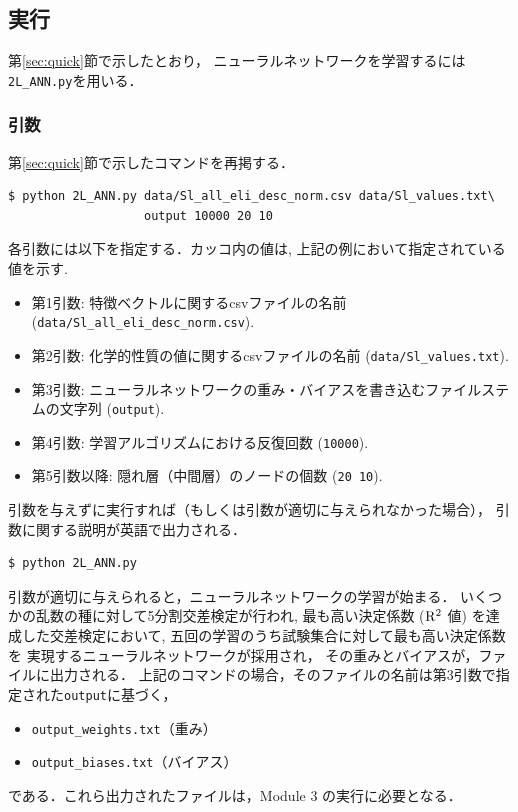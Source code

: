 \documentclass[11pt, titlepage, dvipdfmx, twoside]{jarticle}
\newcommand{\secref}[1]{第\ref{sec:#1}節}
\begin{document}
\subsection{実行}
\secref{quick}で示したとおり，
ニューラルネットワークを学習するには{\tt 2L\_ANN.py}を用いる．

\subsubsection{引数}
\secref{quick}で示したコマンドを再掲する．
\begin{oframed}
{\small
\begin{verbatim}
$ python 2L_ANN.py data/Sl_all_eli_desc_norm.csv data/Sl_values.txt\
                   output 10000 20 10
\end{verbatim}
}
\end{oframed}

各引数には以下を指定する．カッコ内の値は, 上記の例において指定されている値を示す. 
\begin{itemize}
\item 第1引数: 特徴ベクトルに関するcsvファイルの名前 (\verb|data/Sl_all_eli_desc_norm.csv|). 
\item 第2引数: 化学的性質の値に関するcsvファイルの名前 (\verb|data/Sl_values.txt|). 
\item 第3引数: ニューラルネットワークの重み・バイアスを書き込むファイルステムの文字列 (\verb|output|).
\item 第4引数: 学習アルゴリズムにおける反復回数 (\verb|10000|).
\item 第5引数以降: 隠れ層（中間層）のノードの個数  (\verb|20 10|).
\end{itemize}

引数を与えずに実行すれば（もしくは引数が適切に与えられなかった場合），
引数に関する説明が英語で出力される．
\begin{oframed}
  {\small
\begin{verbatim}
$ python 2L_ANN.py 
\end{verbatim}
  }
  \end{oframed}


引数が適切に与えられると，ニューラルネットワークの学習が始まる．
いくつかの乱数の種に対して5分割交差検定が行われ, 
最も高い決定係数 (${\rm R}^2$ 値) を達成した交差検定において,
五回の学習のうち試験集合に対して最も高い決定係数を
実現するニューラルネットワークが採用され，
その重みとバイアスが，ファイルに出力される．
上記のコマンドの場合，そのファイルの名前は第3引数で指定された\verb|output|に基づく，
\begin{itemize}
\item \verb|output_weights.txt|（重み）
\item \verb|output_biases.txt|（バイアス）
\end{itemize}
である．これら出力されたファイルは，Module 3 の実行に必要となる．
\end{document}
